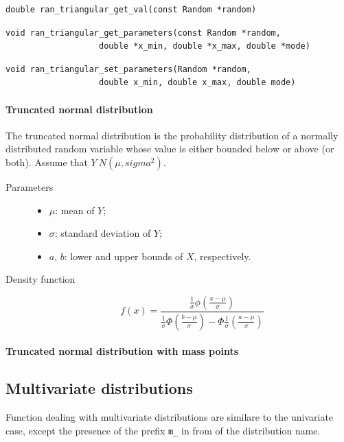 \begin{verbatim}
double ran_triangular_get_val(const Random *random)
\end{verbatim}

\begin{verbatim}
void ran_triangular_get_parameters(const Random *random,
				   double *x_min, double *x_max, double *mode)
\end{verbatim}

\begin{verbatim}
void ran_triangular_set_parameters(Random *random,
				   double x_min, double x_max, double mode)
\end{verbatim}

\paragraph{Truncated normal distribution}

The truncated normal distribution is the probability distribution of a
normally distributed random variable whose value is either bounded
below or above (or both).
Assume that $Y ~ N(\mu, sigma^2)$.
\begin{description}
\item[Parameters]
\begin{itemize}
\item $\mu$: mean of $Y$;
\item $\sigma$: standard deviation of $Y$;
\item $a$, $b$: lower and upper bounds of $X$, respectively.
\end{itemize}
\item[Density function]
\[
f(x) = \frac{\frac{1}{\sigma} \phi \left( \frac{x-\mu}{\sigma} \right)}
{\frac{1}{\sigma} \Phi \left( \frac{b-\mu}{\sigma} \right) - \Phi \frac{1}{\sigma}\left( \frac{a-\mu}{\sigma} \right)}
\]
\end{description}

\paragraph{Truncated normal distribution with mass points}

\subsection{Multivariate distributions}

Function dealing with multivariate distributions are similare to the
univariate case, except the presence of the prefix \verb|m_| in from
of the distribution name.

